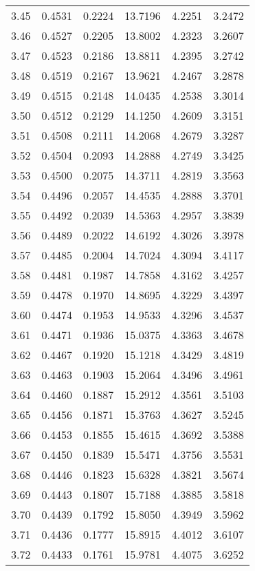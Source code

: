 \documentclass{article}
\begin{document}
\begin{longtable}{cccccc}
3.45 & 0.4531 & 0.2224 & 13.7196 & 4.2251 & 3.2472 \\
3.46 & 0.4527 & 0.2205 & 13.8002 & 4.2323 & 3.2607 \\
3.47 & 0.4523 & 0.2186 & 13.8811 & 4.2395 & 3.2742 \\
3.48 & 0.4519 & 0.2167 & 13.9621 & 4.2467 & 3.2878 \\
3.49 & 0.4515 & 0.2148 & 14.0435 & 4.2538 & 3.3014 \\
3.50 & 0.4512 & 0.2129 & 14.1250 & 4.2609 & 3.3151 \\
3.51 & 0.4508 & 0.2111 & 14.2068 & 4.2679 & 3.3287 \\
3.52 & 0.4504 & 0.2093 & 14.2888 & 4.2749 & 3.3425 \\
3.53 & 0.4500 & 0.2075 & 14.3711 & 4.2819 & 3.3563 \\
3.54 & 0.4496 & 0.2057 & 14.4535 & 4.2888 & 3.3701 \\
3.55 & 0.4492 & 0.2039 & 14.5363 & 4.2957 & 3.3839 \\
3.56 & 0.4489 & 0.2022 & 14.6192 & 4.3026 & 3.3978 \\
3.57 & 0.4485 & 0.2004 & 14.7024 & 4.3094 & 3.4117 \\
3.58 & 0.4481 & 0.1987 & 14.7858 & 4.3162 & 3.4257 \\
3.59 & 0.4478 & 0.1970 & 14.8695 & 4.3229 & 3.4397 \\
3.60 & 0.4474 & 0.1953 & 14.9533 & 4.3296 & 3.4537 \\
3.61 & 0.4471 & 0.1936 & 15.0375 & 4.3363 & 3.4678 \\
3.62 & 0.4467 & 0.1920 & 15.1218 & 4.3429 & 3.4819 \\
3.63 & 0.4463 & 0.1903 & 15.2064 & 4.3496 & 3.4961 \\
3.64 & 0.4460 & 0.1887 & 15.2912 & 4.3561 & 3.5103 \\
3.65 & 0.4456 & 0.1871 & 15.3763 & 4.3627 & 3.5245 \\
3.66 & 0.4453 & 0.1855 & 15.4615 & 4.3692 & 3.5388 \\
3.67 & 0.4450 & 0.1839 & 15.5471 & 4.3756 & 3.5531 \\
3.68 & 0.4446 & 0.1823 & 15.6328 & 4.3821 & 3.5674 \\
3.69 & 0.4443 & 0.1807 & 15.7188 & 4.3885 & 3.5818 \\
3.70 & 0.4439 & 0.1792 & 15.8050 & 4.3949 & 3.5962 \\
3.71 & 0.4436 & 0.1777 & 15.8915 & 4.4012 & 3.6107 \\
3.72 & 0.4433 & 0.1761 & 15.9781 & 4.4075 & 3.6252 \\

\end{longtable}
\end{document}

